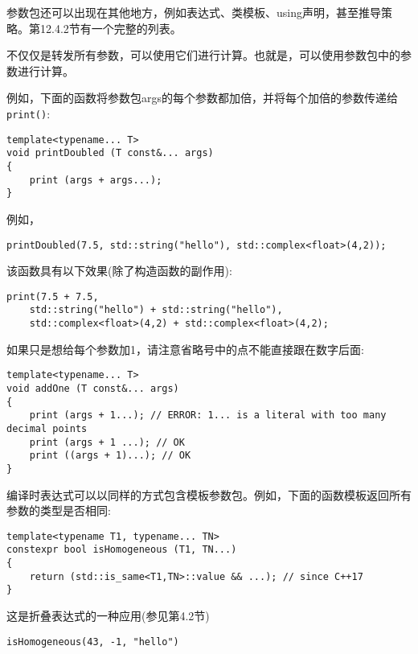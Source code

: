 
参数包还可以出现在其他地方，例如表达式、类模板、using声明，甚至推导策略。第12.4.2节有一个完整的列表。


不仅仅是转发所有参数，可以使用它们进行计算。也就是，可以使用参数包中的参数进行计算。

例如，下面的函数将参数包args的每个参数都加倍，并将每个加倍的参数传递给\texttt{print()}:

\begin{lstlisting}[style=styleCXX]
template<typename... T>
void printDoubled (T const&... args)
{
	print (args + args...);
}
\end{lstlisting}

例如，

\begin{lstlisting}[style=styleCXX]
printDoubled(7.5, std::string("hello"), std::complex<float>(4,2));
\end{lstlisting}

该函数具有以下效果(除了构造函数的副作用):

\begin{lstlisting}[style=styleCXX]
print(7.5 + 7.5,
	std::string("hello") + std::string("hello"),
	std::complex<float>(4,2) + std::complex<float>(4,2);
\end{lstlisting}

如果只是想给每个参数加1，请注意省略号中的点不能直接跟在数字后面:

\begin{lstlisting}[style=styleCXX]
template<typename... T>
void addOne (T const&... args)
{
	print (args + 1...); // ERROR: 1... is a literal with too many decimal points
	print (args + 1 ...); // OK
	print ((args + 1)...); // OK
}
\end{lstlisting}

编译时表达式可以以同样的方式包含模板参数包。例如，下面的函数模板返回所有参数的类型是否相同:

\begin{lstlisting}[style=styleCXX]
template<typename T1, typename... TN>
constexpr bool isHomogeneous (T1, TN...)
{
	return (std::is_same<T1,TN>::value && ...); // since C++17
}
\end{lstlisting}

这是折叠表达式的一种应用(参见第4.2节)

\begin{lstlisting}[style=styleCXX]
isHomogeneous(43, -1, "hello")
\end{lstlisting}

